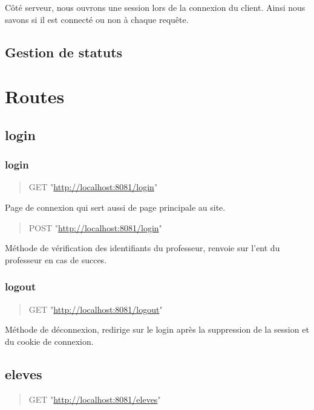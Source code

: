 \documentclass[11pt]{article}
\begin{document}
Côté serveur, nous ouvrons une session lors de la connexion du client.
Ainsi nous savons si il est connecté ou non à chaque requête.

\subsection{Gestion de statuts}
\label{sec:org3b7f521}

\section{Routes}
\label{sec:orgcf1a4ac}
\subsection{login}
\label{sec:org9021b12}
\subsubsection{login}
\label{sec:org10d58cb}

\begin{quote}
GET "\url{http://localhost:8081/login}"
\end{quote}

Page de connexion qui sert aussi de page principale au site.

\begin{quote}
POST "\url{http://localhost:8081/login}"
\end{quote}

Méthode de vérification des identifiants du professeur, renvoie sur l'ent
du professeur en cas de succes.

\subsubsection{logout}
\label{sec:org0049bb2}

\begin{quote}
GET "\url{http://localhost:8081/logout}"
\end{quote}

Méthode de déconnexion, redirige sur le login après la suppression de la session
et du cookie de connexion.

\subsection{eleves}
\label{sec:orgde6b2e6}

\begin{quote}
GET "\url{http://localhost:8081/eleves}"
\end{quote}
\end{document}
